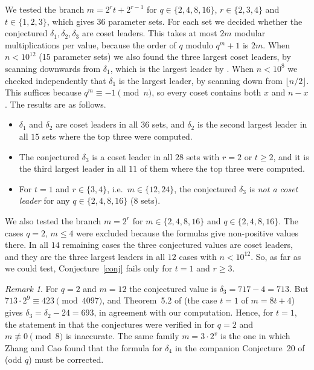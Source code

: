 \documentclass[11pt]{amsart}
\theoremstyle{remark}
\newtheorem{remark}[theorem]{Remark}
\begin{document}
We tested the branch $m=2^rt+2^{r-1}$ for $q\in\{2,4,8,16\}$, $r\in\{2,3,4\}$ and $t\in\{1,2,3\}$, which gives $36$ parameter sets.
For each set we decided whether the conjectured $\delta_1,\delta_2,\delta_3$ are coset leaders.
This takes at most $2m$ modular multiplications per value, because the order of $q$ modulo $q^m+1$ is $2m$.
When $n<10^{12}$ (15 parameter sets) we also found the three largest coset leaders, by scanning downwards from $\delta_1$, which is the largest leader by \cite[Theorem~24]{LLGS}.
When $n<10^8$ we checked independently that $\delta_1$ is the largest leader, by scanning down from $\lfloor n/2\rfloor$.
This suffices because $q^m\equiv-1\pmod n$, so every coset contains both $x$ and $n-x$.
The results are as follows.
\begin{itemize}
\item $\delta_1$ and $\delta_2$ are coset leaders in all $36$ sets, and $\delta_2$ is the second largest leader in all $15$ sets where the top three were computed.
\item The conjectured $\delta_3$ is a coset leader in all $28$ sets with $r=2$ or $t\ge2$, and it is the third largest leader in all $11$ of them where the top three were computed.
\item For $t=1$ and $r\in\{3,4\}$, i.e.\ $m\in\{12,24\}$, the conjectured $\delta_3$ is \emph{not a coset leader} for any $q\in\{2,4,8,16\}$ (8 sets).
\end{itemize}
We also tested the branch $m=2^r$ for $m\in\{2,4,8,16\}$ and $q\in\{2,4,8,16\}$.
The cases $q=2$, $m\le4$ were excluded because the formulas give non-positive values there.
In all $14$ remaining cases the three conjectured values are coset leaders, and they are the three largest leaders in all $12$ cases with $n<10^{12}$.
So, as far as we could test, Conjecture~\ref{conj} fails only for $t=1$ and $r\ge3$.

\begin{remark}
For $q=2$ and $m=12$ the conjectured value is $\delta_3=717-4=713$.
But $713\cdot2^{9}\equiv423\pmod{4097}$, and Theorem~5.2 of \cite{LLFLR} (the case $t=1$ of $m=8t+4$) gives $\delta_3=\delta_2-24=693$, in agreement with our computation.
Hence, for $t=1$, the statement in \cite{LLGS} that the conjectures were verified in \cite{LLFLR} for $q=2$ and $m\not\equiv0\pmod 8$ is inaccurate.
The same family $m=3\cdot 2^{v}$ is the one in which Zhang and Cao \cite[Remark~1]{ZC} found that the formula for $\delta_4$ in the companion Conjecture~20 of \cite{LLGS} (odd $q$) must be corrected.
\end{remark}
\end{document}
